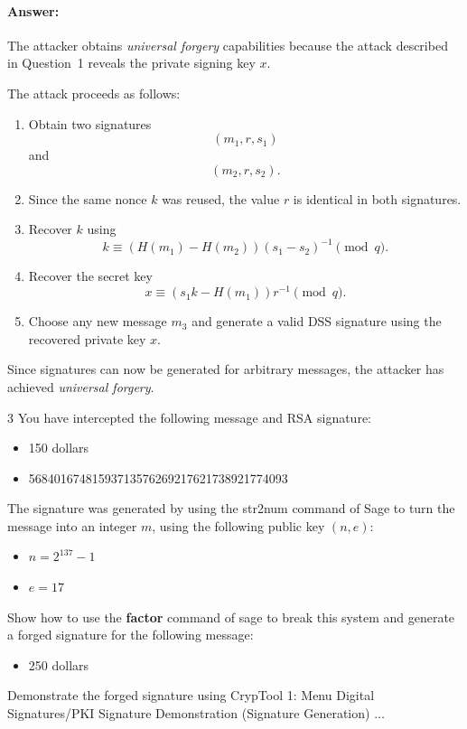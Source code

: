 \documentclass[]{scrartcl}
\newcounter{exercise}
\newcounter{qid}[section]
\newcommand{\exerciseprefix}{prefix}
\newcommand{\questiontitle}{Questions}
\newcommand{\blockid}{B4}
\newcommand{\exname}{}
\begin{document}
\paragraph{Answer:} {The attacker obtains \emph{universal forgery} capabilities because the attack described in Question~1 reveals the private signing key $x$.

The attack proceeds as follows:

\begin{enumerate}
\item Obtain two signatures
\[
(m_1,r,s_1)
\]
and
\[
(m_2,r,s_2).
\]

\item Since the same nonce $k$ was reused, the value $r$ is identical in both signatures.

\item Recover $k$ using
\[
k
\equiv
(H(m_1)-H(m_2))
(s_1-s_2)^{-1}
\pmod q.
\]

\item Recover the secret key
\[
x
\equiv
(s_1k-H(m_1))r^{-1}
\pmod q.
\]

\item Choose any new message $m_3$ and generate a valid DSS signature using the recovered private key $x$.
\end{enumerate}

Since signatures can now be generated for arbitrary messages, the attacker has achieved \emph{universal forgery}.}

\renewcommand{\exerciseprefix}{PS-\blockid{}-E\theexercise: \exname{}-Q\theqid}
\renewcommand{\questiontitle}{\exerciseprefix{}: Attacking RSA signature}
\begin{exercisebox}{3}
You have intercepted the following message and RSA signature:
\begin{itemize}
    \item 150 dollars
    \item 56840167481593713576269217621738921774093
\end{itemize}
The signature was generated by using the str2num command of Sage to turn the message into an
integer $m$, using the following public key $(n,e)$:
\begin{itemize}
    \item $n = 2^{137} - 1$
    \item $e = 17$
\end{itemize}
Show how to use the \textbf{factor} command of sage to break this system and generate a forged signature for the following message:
\begin{itemize}
    \item 250 dollars
\end{itemize}
Demonstrate the forged signature using CrypTool 1: Menu Digital Signatures/PKI \faLongArrowRight Signature Demonstration (Signature Generation) $\ldots$
\end{exercisebox}
\end{document}
